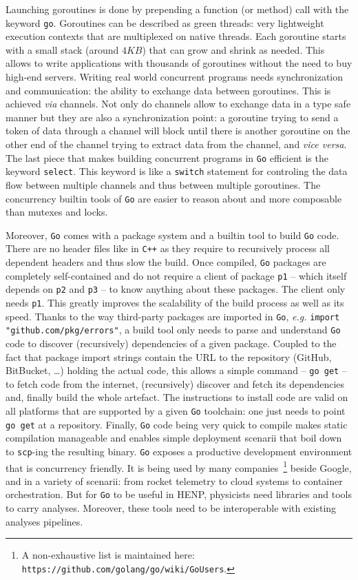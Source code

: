 \documentclass[a4paper]{jpconf}
\begin{document}
Launching goroutines is done by prepending a function (or method) call with the keyword \texttt{go}.
Goroutines can be described as green threads: very lightweight execution contexts that are multiplexed on native threads.
Each goroutine starts with a small stack (around $4KB$) that can grow and shrink as needed.
This allows to write applications with thousands of goroutines without the need to buy high-end servers.
Writing real world concurrent programs needs synchronization and communication: the ability to exchange data between goroutines.
This is achieved \emph{via} channels.
Not only do channels allow to exchange data in a type safe manner but they are also a synchronization point: a goroutine trying to send a token of data through a channel will block until there is another goroutine on the other end of the channel trying to extract data from the channel, and \emph{vice versa}.
The last piece that makes building concurrent programs in \texttt{Go} efficient is the keyword \texttt{select}.
This keyword is like a \texttt{switch} statement for controling the data flow between multiple channels and thus between multiple goroutines.
The concurrency builtin tools of \texttt{Go} are easier to reason about and more composable than mutexes and locks.

Moreover, \texttt{Go} comes with a package system and a builtin tool to build \texttt{Go} code.
There are no header files like in \texttt{C++} as they require to recursively process all dependent headers and thus slow the build.
Once compiled, \texttt{Go} packages are completely self-contained and do not require a client of package \texttt{p1} -- which itself depends on \texttt{p2} and \texttt{p3} -- to know anything about these packages.
The client only needs \texttt{p1}.
This greatly improves the scalability of the build process as well as its speed.
Thanks to the way third-party packages are imported in \texttt{Go}, \emph{e.g.} \texttt{import "github.com/pkg/errors"}, a build tool only needs to parse and understand \texttt{Go} code to discover (recursively) dependencies of a given package.
Coupled to the fact that package import strings contain the URL to the repository (GitHub, BitBucket, \ldots) holding the actual code, this allows a simple command -- \texttt{go get} -- to fetch code from the internet, (recursively) discover and fetch its dependencies and, finally build the whole artefact.
The instructions to install code are valid on all platforms that are supported by a given \texttt{Go} toolchain: one just needs to point \texttt{go get} at a repository.
Finally, \texttt{Go} code being very quick to compile makes static compilation manageable and enables simple deployment scenarii that boil down to \texttt{scp}-ing the resulting binary.
\texttt{Go} exposes a productive development environment that is concurrency friendly.
It is being used by many companies~\footnote{A non-exhaustive list is maintained here: \texttt{https://github.com/golang/go/wiki/GoUsers}.} beside Google, and in a variety of scenarii: from rocket telemetry to cloud systems to container orchestration.
But for \texttt{Go} to be useful in HENP, physicists need libraries and tools to carry analyses.
Moreover, these tools need to be interoperable with existing analyses pipelines.
\end{document}
